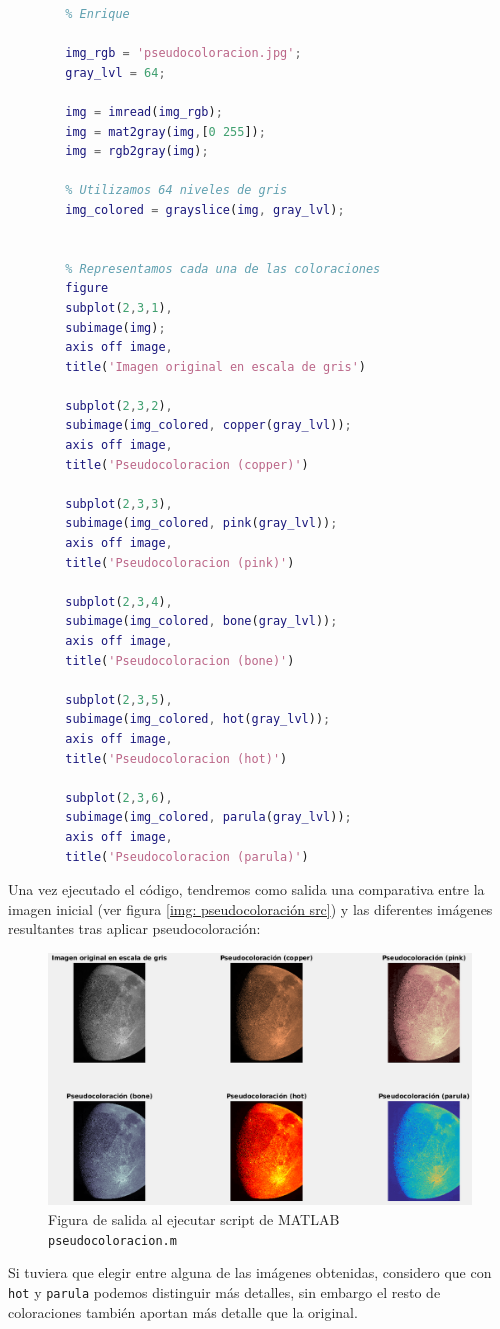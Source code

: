 \documentclass[12pt]{article}
\begin{document}
	\begin{lstlisting}[language=Matlab, caption={Implementación de pseucoloración en \texttt{MATLAB}}]
		% 8 - Pseudocoloracion por nivel de gris
		% Enrique 
		
		img_rgb = 'pseudocoloracion.jpg';
		gray_lvl = 64;
		
		img = imread(img_rgb);
		img = mat2gray(img,[0 255]);
		img = rgb2gray(img);
		
		% Utilizamos 64 niveles de gris
		img_colored = grayslice(img, gray_lvl);
		
		
		% Representamos cada una de las coloraciones
		figure
		subplot(2,3,1),
		subimage(img);
		axis off image,
		title('Imagen original en escala de gris')
		
		subplot(2,3,2),
		subimage(img_colored, copper(gray_lvl));
		axis off image,
		title('Pseudocoloracion (copper)')
		
		subplot(2,3,3),
		subimage(img_colored, pink(gray_lvl));
		axis off image,
		title('Pseudocoloracion (pink)')
		
		subplot(2,3,4),
		subimage(img_colored, bone(gray_lvl));
		axis off image,
		title('Pseudocoloracion (bone)')
		
		subplot(2,3,5),
		subimage(img_colored, hot(gray_lvl));
		axis off image,
		title('Pseudocoloracion (hot)')
		
		subplot(2,3,6),
		subimage(img_colored, parula(gray_lvl));
		axis off image,
		title('Pseudocoloracion (parula)')
	\end{lstlisting}
	
	\pagebreak
	
	\noindent Una vez ejecutado el código, tendremos como salida una comparativa entre la imagen inicial (ver figura \ref{img: pseudocoloración src}) y las diferentes imágenes resultantes tras aplicar pseudocoloración:
	
	\begin{figure}[h]
		\begin{center}
			\includegraphics[width=1\textwidth]{img/pseudocoloracion_output.png}
			\caption{Figura de salida al ejecutar script de MATLAB \texttt{pseudocoloracion.m}}
			\label{img: pseudocoloracion output}
		\end{center}
	\end{figure}

	\noindent Si tuviera que elegir entre alguna de las imágenes obtenidas, considero que con \texttt{hot} y \texttt{parula} podemos distinguir más detalles, sin embargo el resto de coloraciones también aportan más detalle que la original.
	
	\pagebreak
\end{document}
